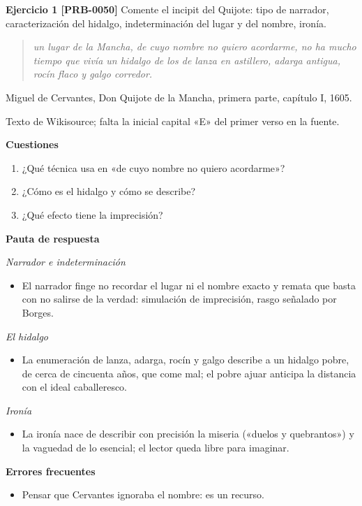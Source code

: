 \documentclass{book}
\begin{document}
\noindent\textbf{Ejercicio 1 [PRB-0050]}
Comente el incipit del Quijote: tipo de narrador, caracterización del hidalgo, indeterminación del lugar y del nombre, ironía.


\begin{quote}
\itshape un lugar de la Mancha, de cuyo nombre no quiero acordarme, no ha mucho tiempo que vivía un hidalgo de los de lanza en astillero, adarga antigua, rocín flaco y galgo corredor.
\end{quote}
{\noindent\footnotesize Miguel de Cervantes, Don Quijote de la Mancha, primera parte, capítulo I, 1605.\par}
{\noindent\footnotesize Texto de Wikisource; falta la inicial capital «E» del primer verso en la fuente.\par}

\noindent\textbf{Cuestiones}
\begin{enumerate}
\item ¿Qué técnica usa en «de cuyo nombre no quiero acordarme»?
\item ¿Cómo es el hidalgo y cómo se describe?
\item ¿Qué efecto tiene la imprecisión?
\end{enumerate}

\noindent\textbf{Pauta de respuesta}

\noindent\textit{Narrador e indeterminación}
\begin{itemize}
\item El narrador finge no recordar el lugar ni el nombre exacto y remata que basta con no salirse de la verdad: simulación de imprecisión, rasgo señalado por Borges.
\end{itemize}

\noindent\textit{El hidalgo}
\begin{itemize}
\item La enumeración de lanza, adarga, rocín y galgo describe a un hidalgo pobre, de cerca de cincuenta años, que come mal; el pobre ajuar anticipa la distancia con el ideal caballeresco.
\end{itemize}

\noindent\textit{Ironía}
\begin{itemize}
\item La ironía nace de describir con precisión la miseria («duelos y quebrantos») y la vaguedad de lo esencial; el lector queda libre para imaginar.
\end{itemize}

\noindent\textbf{Errores frecuentes}
\begin{itemize}
\item Pensar que Cervantes ignoraba el nombre: es un recurso.
\end{itemize}
\end{document}
